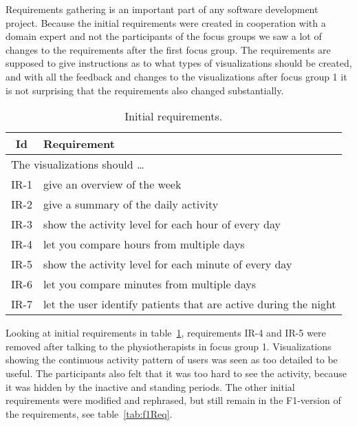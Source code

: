 Requirements gathering is an important part of any software development project. Because the initial requirements were created in cooperation with a domain expert and not the participants of the focus groups we saw a lot of changes to the requirements after the first focus group. The requirements are supposed to give instructions as to what types of visualizations should be created, and with all the feedback and changes to the visualizations after focus group 1 it is not surprising that the requirements also changed substantially.

\begin{table}[h!]
  \begin{center}
  \begin{tabular}{|c|p{12cm}|}
    \hline
      \textbf{Id} & \textbf{Requirement} \\ \hline
    \multicolumn{2}{|l|}{The visualizations should \ldots} \\ \hline
      IR-1 & give an overview of the week \\ \hline
      IR-2 & give a summary of the daily activity \\ \hline
      IR-3 & show the activity level for each hour of every day \\ \hline
      IR-4 & let you compare hours from multiple days \\ \hline
      IR-5 & show the activity level for each minute of every day \\ \hline
      IR-6 & let you compare minutes from multiple days \\ \hline
      IR-7 & let the user identify patients that are active during the night \\ \hline
  \end{tabular}
  \end{center}
  \caption{Initial requirements.}
  \label{tab:initReq}
\end{table}

Looking at initial requirements in table~\ref{tab:initReq}, requirements IR-4 and IR-5 were removed after talking to the physiotherapists in focus group 1. Visualizations showing the continuous activity pattern of users was seen as too detailed to be useful. The participants also felt that it was too hard to see the activity, because it was hidden by the inactive and standing periods. The other initial requirements were modified and rephrased, but still remain in the F1-version of the requirements, see table~\ref{tab:f1Req}. 

